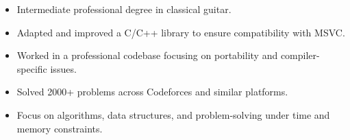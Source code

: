 \documentclass[10pt,a4paper,ragged2e]{altacv}
\begin{document}
\begin{itemize}
\item Intermediate professional degree in classical guitar.
\end{itemize}



\begin{itemize}
\item Adapted and improved a C/C++ library to ensure compatibility with MSVC.
\item Worked in a professional codebase focusing on portability and compiler-specific issues.
\end{itemize}




\divider


\divider


\divider


\begin{itemize}
\item Solved 2000+ problems across Codeforces and similar platforms.
\item Focus on algorithms, data structures, and problem-solving under time and memory constraints.
\end{itemize}
\end{document}
